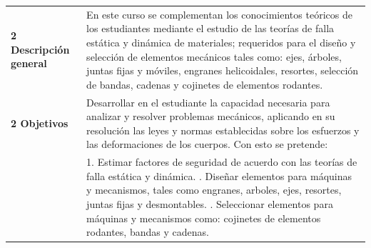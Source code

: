 \documentclass[letterpaper]{article}%
\begin{document}
\newpage%
\renewcommand{\arraystretch}{1.5}%
\begin{longtable}{p{}p{}}%
\par\fontsize{12}{0}\selectfont \textbf{\textcolor{parte}{2 Descripción general}}&En este curso se complementan los conocimientos teóricos de los estudiantes mediante el estudio de las teorías de falla estática y dinámica de materiales; requeridos para el diseño y selección de elementos mecánicos tales como: ejes, árboles, juntas fijas y móviles, engranes helicoidales, resortes, selección de bandas, cadenas y cojinetes de elementos rodantes.\\%
\par\fontsize{12}{0}\selectfont \textbf{\textcolor{parte}{2 Objetivos}}&Desarrollar en el estudiante la capacidad necesaria para analizar y 
\newline%
resolver problemas mecánicos, aplicando en su resolución las leyes y normas establecidas sobre los esfuerzos y las deformaciones de los cuerpos. Con esto se pretende:\\%
&1. Estimar factores de seguridad de acuerdo con las teorías de falla estática y dinámica. 
\newline%
     2. Diseñar elementos para máquinas y mecanismos, tales como engranes, arboles, ejes, resortes, juntas fijas y desmontables.
\newline%
      3. Seleccionar elementos para máquinas y mecanismos como: cojinetes de elementos rodantes, bandas y cadenas.\\%
\end{longtable}%
\end{document}
